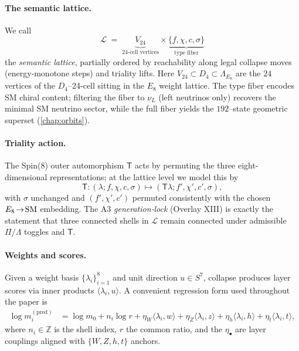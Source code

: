 \paragraph{The semantic lattice.}
We call
\[
  \mathcal L \;=\;
  \underbrace{V_{24}}_{\text{24-cell vertices}}\times
  \underbrace{\{f,\chi,c,\sigma\}}_{\text{type fiber}}
\]
the \emph{semantic lattice}, partially ordered by reachability along legal
collapse moves (energy‐monotone steps) and triality lifts. Here
\(V_{24}\subset D_4\subset \Lambda_{E_8}\) are the \(24\) vertices of the
\(D_4\)–24-cell sitting in the \(E_8\) weight lattice. The type fiber encodes
SM chiral content; filtering the fiber to \(\nu_L\) (left neutrinos only)
recovers the minimal SM neutrino sector, while the full fiber yields the
\(192\)–state geometric superset (\ref{chap:orbits}).

\paragraph{Triality action.}
The Spin(8) outer automorphism \(\mathsf T\) acts by permuting the three
eight-dimensional representations; at the lattice level we model this by
\[
  \mathsf T : (\lambda; f,\chi,c,\sigma)\longmapsto
  (\mathsf T\lambda; f',\chi',c',\sigma),
\]
with \(\sigma\) unchanged and \((f',\chi',c')\) permuted consistently with the
chosen \(E_8\!\to\!{\rm SM}\) embedding. The A3 \emph{generation‐lock} (Overlay XIII)
is exactly the statement that three connected shells in \(\mathcal L\) remain
connected under admissible \(\Pi/\Lambda\) toggles and \(\mathsf T\).

\paragraph{Weights and scores.}
Given a weight basis \(\{\lambda_i\}_{i=1}^8\) and unit direction \(u\in S^7\),
collapse produces layer scores via inner products \(\langle\lambda_i,u\rangle\).
A convenient regression form used throughout the paper is
\begin{align}
\log m_i^{(\mathrm{pred})}
 &= \log m_0 + n_i \log r
   + \eta_W\!\langle\lambda_i,w\rangle
   + \eta_Z\!\langle\lambda_i,z\rangle
   + \eta_h\!\langle\lambda_i,h\rangle
   + \eta_t\!\langle\lambda_i,t\rangle ,
\label{eq:sem-compiler-weights}
\end{align}
where \(n_i\in\mathbb Z\) is the shell index, \(r\) the common ratio, and the
\(\eta_\bullet\) are layer couplings aligned with \(\{W,Z,h,t\}\) anchors.

